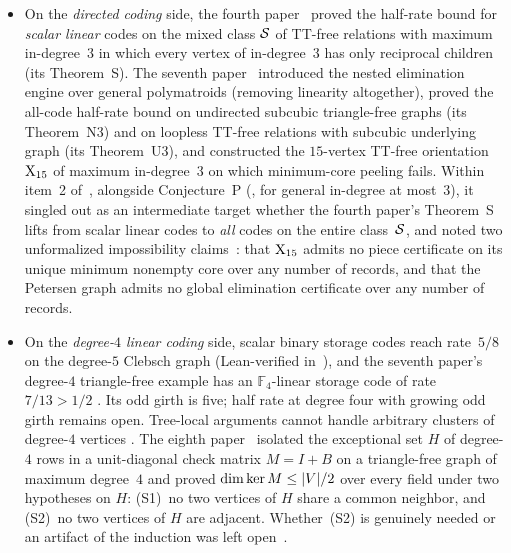 \begin{itemize}
\item On the \emph{directed coding} side, the fourth paper~\cite{FourthPaper2026} proved the half-rate bound for
  \emph{scalar linear} codes on the mixed class $\mathcal{S}$ of TT-free relations with maximum in-degree~$3$ in which every
  vertex of in-degree~$3$ has only reciprocal children (its Theorem~S). The seventh paper~\cite{SeventhPaper2026}
  introduced the nested elimination engine over general polymatroids (removing linearity altogether), proved the
  all-code half-rate bound on undirected subcubic triangle-free graphs (its Theorem~N3) and on loopless TT-free relations
  with subcubic underlying graph (its Theorem~U3), and constructed the
  $15$-vertex TT-free orientation $\mathrm{X}_{15}$ of maximum in-degree~$3$ on which minimum-core peeling fails. Within item~2
  of~\cite[Section~9.2]{SeventhPaper2026}, alongside Conjecture~P (\cite[Conjecture~9.1]{SeventhPaper2026}, for general
  in-degree at most~$3$), it singled out as an intermediate target whether the fourth paper's Theorem~S lifts from scalar
  linear codes to \emph{all} codes on the entire class~$\mathcal{S}$, and noted two unformalized impossibility
  claims~\cite[Remarks~7.3 and~7.5; Section~9.2, item~6]{SeventhPaper2026}: that $\mathrm{X}_{15}$ admits no piece certificate on its
  unique minimum nonempty core over any number of records, and that the Petersen graph admits no global elimination
  certificate over any number of records.
\item On the \emph{degree-$4$ linear coding} side, scalar binary storage codes reach rate~$5/8$ on the degree-$5$
  Clebsch graph (Lean-verified in~\cite[Corollary~6.11]{FourthPaper2026}), and the seventh paper's degree-$4$
  triangle-free example has an $\mathbb F_4$-linear storage code of rate~$7/13>1/2$
  \cite[Example~7.8]{SeventhPaper2026}. Its odd girth is five; half rate at degree four with growing odd girth remains
  open. Tree-local arguments cannot handle arbitrary clusters of degree-$4$ vertices
  \cite[Proposition~6.28]{FourthPaper2026}. The eighth
  paper~\cite{EighthPaper2026} isolated the exceptional set $H$ of degree-$4$ rows in a unit-diagonal check matrix
  $M = I + B$ on a triangle-free graph of maximum degree~$4$ and proved $\dim\ker M \le \lvert V \rvert/2$ over every field
  under two hypotheses on $H$: (S1)~no two vertices of $H$ share a common neighbor, and (S2)~no two vertices of $H$ are
  adjacent. Whether~(S2) is genuinely needed or an artifact of the induction was left
  open~\cite[Section~8.2, Remark~8.8; Section~10, Problem~10.4]{EighthPaper2026}.

\end{itemize}
